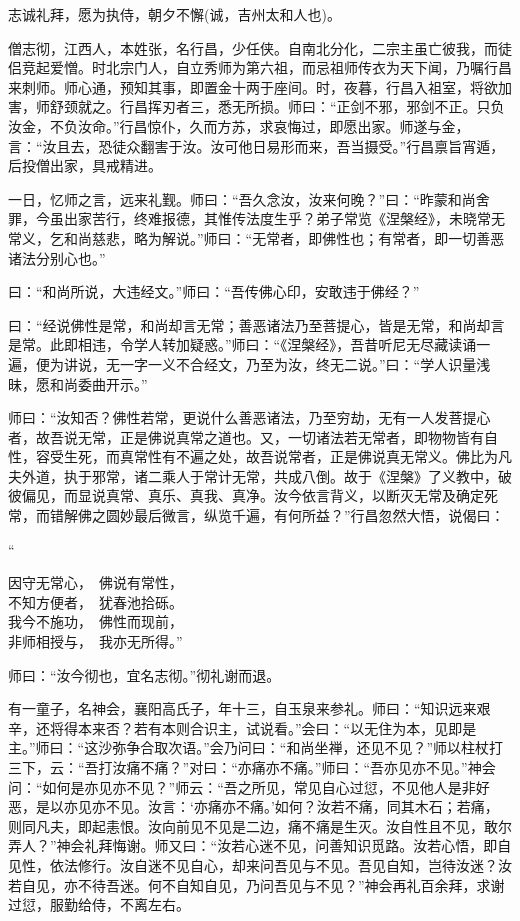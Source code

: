 \documentclass[UTF8, 11pt, oneside]{ctexart}
\newenvironment{jizi}[1]{
    \vspace{-1em}\begin{center}
        #1%
        \begin{varwidth}[t]{\linewidth}
}{
        \end{varwidth}
    \end{center}
}
\begin{document}
志诚礼拜，愿为执侍，朝夕不懈(诚，吉州太和人也)。

僧志彻，江西人，本姓张，名行昌，少任侠。自南北分化，二宗主虽亡彼我，而徒侣竞起爱憎。时北宗门人，自立秀师为第六祖，而忌祖师传衣为天下闻，乃嘱行昌来刺师。师心通，预知其事，即置金十两于座间。时，夜暮，行昌入祖室，将欲加害，师舒颈就之。行昌挥刃者三，悉无所损。师曰：“正剑不邪，邪剑不正。只负汝金，不负汝命。”行昌惊仆，久而方苏，求哀悔过，即愿出家。师遂与金，言：“汝且去，恐徒众翻害于汝。汝可他日易形而来，吾当摄受。”行昌禀旨宵遁，后投僧出家，具戒精进。

一日，忆师之言，远来礼觐。师曰：“吾久念汝，汝来何晚？”曰：“昨蒙和尚舍罪，今虽出家苦行，终难报德，其惟传法度生乎？弟子常览《涅槃经》，未晓常无常义，乞和尚慈悲，略为解说。”师曰：“无常者，即佛性也；有常者，即一切善恶诸法分别心也。”

曰：“和尚所说，大违经文。”师曰：“吾传佛心印，安敢违于佛经？”

曰：“经说佛性是常，和尚却言无常；善恶诸法乃至菩提心，皆是无常，和尚却言是常。此即相违，令学人转加疑惑。”师曰：“《涅槃经》，吾昔听尼无尽藏读诵一遍，便为讲说，无一字一义不合经文，乃至为汝，终无二说。”曰：“学人识量浅昧，愿和尚委曲开示。”

师曰：“汝知否？佛性若常，更说什么善恶诸法，乃至穷劫，无有一人发菩提心者，故吾说无常，正是佛说真常之道也。又，一切诸法若无常者，即物物皆有自性，容受生死，而真常性有不遍之处，故吾说常者，正是佛说真无常义。佛比为凡夫外道，执于邪常，诸二乘人于常计无常，共成八倒。故于《涅槃》了义教中，破彼偏见，而显说真常、真乐、真我、真净。汝今依言背义，以断灭无常及确定死常，而错解佛之圆妙最后微言，纵览千遍，有何所益？”行昌忽然大悟，说偈曰：

\begin{jizi}{“}
    因守无常心，　佛说有常性， \\
    不知方便者，　犹春池拾砾。 \\
    我今不施功，　佛性而现前， \\
    非师相授与，　我亦无所得。”
\end{jizi}

师曰：“汝今彻也，宜名志彻。”彻礼谢而退。

有一童子，名神会，襄阳高氏子，年十三，自玉泉来参礼。师曰：“知识远来艰辛，还将得本来否？若有本则合识主，试说看。”会曰：“以无住为本，见即是主。”师曰：“这沙弥争合取次语。”会乃问曰：“和尚坐禅，还见不见？”师以柱杖打三下，云：“吾打汝痛不痛？”对曰：“亦痛亦不痛。”师曰：“吾亦见亦不见。”神会问：“如何是亦见亦不见？”师云：“吾之所见，常见自心过愆，不见他人是非好恶，是以亦见亦不见。汝言：‘亦痛亦不痛。’如何？汝若不痛，同其木石；若痛，则同凡夫，即起恚恨。汝向前见不见是二边，痛不痛是生灭。汝自性且不见，敢尔弄人？”神会礼拜悔谢。师又曰：“汝若心迷不见，问善知识觅路。汝若心悟，即自见性，依法修行。汝自迷不见自心，却来问吾见与不见。吾见自知，岂待汝迷？汝若自见，亦不待吾迷。何不自知自见，乃问吾见与不见？”神会再礼百余拜，求谢过愆，服勤给侍，不离左右。
\end{document}

